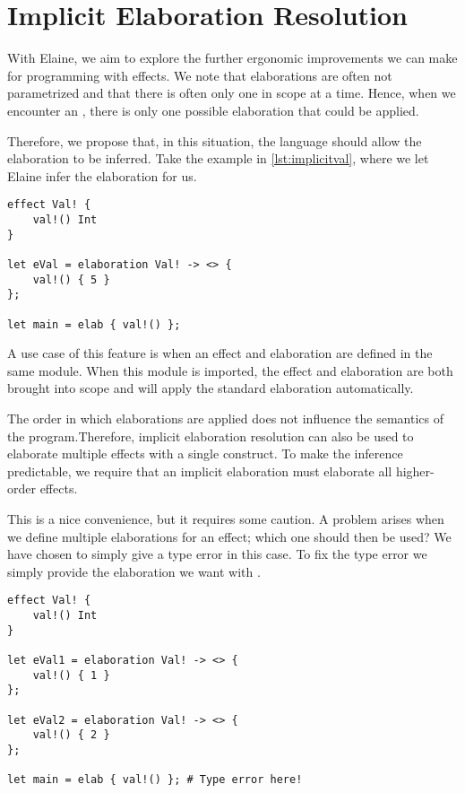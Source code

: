 \chapter{Implicit Elaboration Resolution}\label{chap:elabres}


With Elaine, we aim to explore the further ergonomic improvements we can make for programming with effects. We note that elaborations are often not parametrized and that there is often only one in scope at a time. Hence, when we encounter an \elab, there is only one possible elaboration that could be applied.

Therefore, we propose that, in this situation, the language should allow the elaboration to be inferred. Take the example in \cref{lst:implicitval}, where we let Elaine infer the elaboration for us.

\begin{lstlisting}[language=elaine,style=fancy,caption={The \el{Val!} effect with implicit elaboration},label={lst:implicitval}]
effect Val! {
    val!() Int
}

let eVal = elaboration Val! -> <> {
    val!() { 5 }
};

let main = elab { val!() };
\end{lstlisting}

A use case of this feature is when an effect and elaboration are defined in the same module. When this module is imported, the effect and elaboration are both brought into scope and  will apply the standard elaboration automatically.


The order in which elaborations are applied does not influence the semantics of the program.\citationneeded Therefore, implicit elaboration resolution can also be used to elaborate multiple effects with a single  construct. To make the inference predictable, we require that an implicit elaboration must elaborate all higher-order effects.

This is a nice convenience, but it requires some caution. A problem arises when we define multiple elaborations for an effect; which one should then be used? We have chosen to simply give a type error in this case. To fix the type error we simply provide the elaboration we want with .

\begin{lstlisting}[language=elaine,style=fancy]
effect Val! {
    val!() Int
}

let eVal1 = elaboration Val! -> <> {
    val!() { 1 }
};

let eVal2 = elaboration Val! -> <> {
    val!() { 2 }
};

let main = elab { val!() }; # Type error here!
\end{lstlisting}

